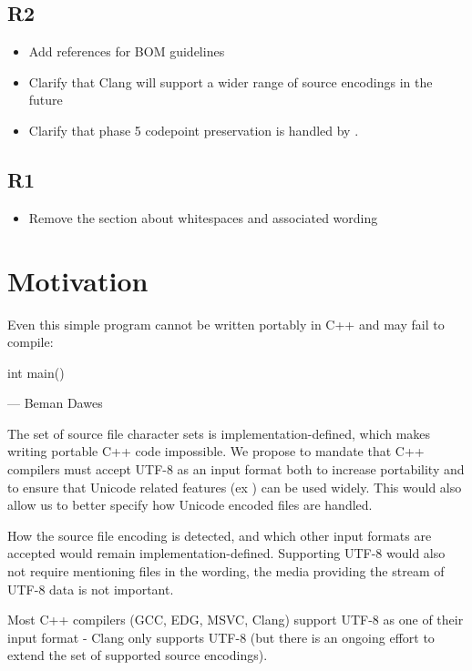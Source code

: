 \documentclass{wg21}
\begin{document}
\subsection{R2}
\begin{itemize}
    \item Add references for BOM guidelines
    \item Clarify that Clang will support a wider range of source encodings in the future
    \item Clarify that phase 5 codepoint preservation is handled by .
\end{itemize}

\subsection{R1}
\begin{itemize}
    \item Remove the section about whitespaces and associated wording
\end{itemize}

\section{Motivation}

\begin{quoteblock}
    Even this simple program cannot be written portably in C++ and may fail to compile:
\begin{codeblock}
    int main() {}
\end{codeblock}
 --- Beman Dawes
\end{quoteblock}

The set of source file character sets is implementation-defined, which makes writing portable C++ code impossible.
We propose to mandate that C++ compilers must accept UTF-8 as an input format both to increase portability and
to ensure that Unicode related features (ex ) can be used widely.
This would also allow us to better specify how Unicode encoded files are handled.

How the source file encoding is detected, and which other input formats are accepted would remain implementation-defined.
Supporting UTF-8 would also not require mentioning files in the wording, the media providing the stream of UTF-8 data is not important.

Most C++ compilers (GCC, EDG, MSVC, Clang) support UTF-8 as one of their input format - Clang only supports UTF-8 (but there is an ongoing effort to extend the set of supported
source encodings).
\end{document}
